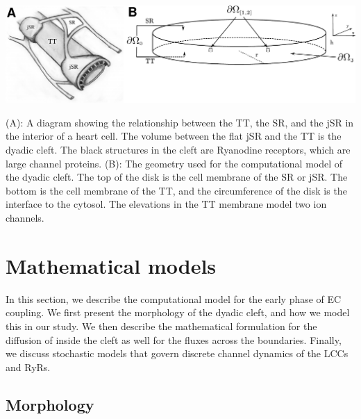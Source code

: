 \begin{figurewithlongcaption}
\label{fig:hake:morphology}
  \centering
  \includegraphics[width=\largefig]{chapters/hake/pdf/morphology}
  \caption[The dyadic cleft]{(A): A diagram showing the
    relationship between the TT, the SR, and the jSR in the interior
    of a heart cell. The volume between the flat jSR and the TT is the
    dyadic cleft. The black structures in the cleft are Ryanodine
    receptors, which are large channel proteins. (B): The
    geometry used for the computational model of the dyadic cleft. The
    top of the disk is the cell membrane of the SR or jSR. The bottom
    is the cell membrane of the TT, and the circumference of the disk
    is the interface to the cytosol. The elevations in the TT membrane
    model two \Ca ion channels.}
\end{figurewithlongcaption}

\section{Mathematical models}
\label{sec:hake:mathematical-models}

In this section, we describe the computational model for the early
phase of EC coupling. We first present the morphology of the dyadic
cleft, and how we model this in our study. We then describe the
mathematical formulation for the diffusion of \Ca inside the cleft as
well for the \Ca fluxes across the boundaries. Finally, we discuss
stochastic models that govern discrete channel dynamics of the LCCs
and RyRs.

\subsection{Morphology}
\label{sec:hake:morphology}
  

